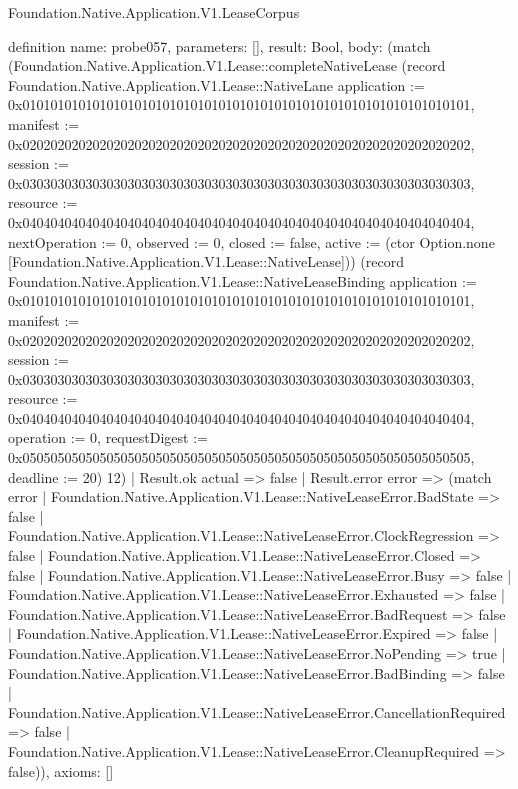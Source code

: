 \begin{lexlean}{Foundation.Native.Application.V1.LeaseCorpus}
\begin{semanticmodule}
definition{
  name: probe057,
  parameters: [],
  result: Bool,
  body: (match (Foundation.Native.Application.V1.Lease::completeNativeLease (record Foundation.Native.Application.V1.Lease::NativeLane {application := 0x0101010101010101010101010101010101010101010101010101010101010101, manifest := 0x0202020202020202020202020202020202020202020202020202020202020202, session := 0x0303030303030303030303030303030303030303030303030303030303030303, resource := 0x0404040404040404040404040404040404040404040404040404040404040404, nextOperation := 0, observed := 0, closed := false, active := (ctor Option.none [Foundation.Native.Application.V1.Lease::NativeLease])}) (record Foundation.Native.Application.V1.Lease::NativeLeaseBinding {application := 0x0101010101010101010101010101010101010101010101010101010101010101, manifest := 0x0202020202020202020202020202020202020202020202020202020202020202, session := 0x0303030303030303030303030303030303030303030303030303030303030303, resource := 0x0404040404040404040404040404040404040404040404040404040404040404, operation := 0, requestDigest := 0x0505050505050505050505050505050505050505050505050505050505050505, deadline := 20}) 12)
    | Result.ok actual => false
    | Result.error error => (match error
      | Foundation.Native.Application.V1.Lease::NativeLeaseError.BadState => false
      | Foundation.Native.Application.V1.Lease::NativeLeaseError.ClockRegression => false
      | Foundation.Native.Application.V1.Lease::NativeLeaseError.Closed => false
      | Foundation.Native.Application.V1.Lease::NativeLeaseError.Busy => false
      | Foundation.Native.Application.V1.Lease::NativeLeaseError.Exhausted => false
      | Foundation.Native.Application.V1.Lease::NativeLeaseError.BadRequest => false
      | Foundation.Native.Application.V1.Lease::NativeLeaseError.Expired => false
      | Foundation.Native.Application.V1.Lease::NativeLeaseError.NoPending => true
      | Foundation.Native.Application.V1.Lease::NativeLeaseError.BadBinding => false
      | Foundation.Native.Application.V1.Lease::NativeLeaseError.CancellationRequired => false
      | Foundation.Native.Application.V1.Lease::NativeLeaseError.CleanupRequired => false)),
  axioms: []
}


\end{semanticmodule}
\end{lexlean}
